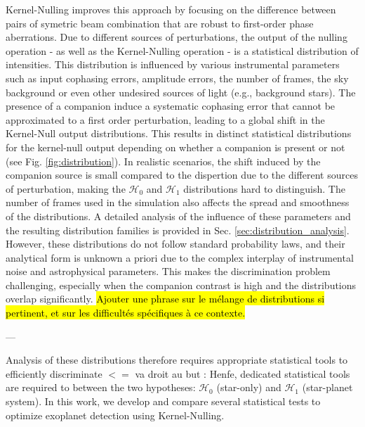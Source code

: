 \documentclass{article}
\newcommand{\dm}[1]{{\color{mulberry} #1}}
\begin{document}
Kernel-Nulling \cite{Martinache2018} improves this approach by focusing on the difference between pairs of symetric beam combination that are robust to first-order phase aberrations. Due to different sources of perturbations, the output of the nulling operation - as well as the Kernel-Nulling operation - is a statistical distribution of intensities. This distribution is influenced by various instrumental parameters such as input cophasing errors, amplitude errors, the number of frames, the sky background or even other undesired sources of light (e.g., background stars). The presence of a companion induce a systematic cophasing error that cannot be approximated to a first order perturbation, leading to a global shift in the Kernel-Null output distributions. This results in distinct statistical distributions for the kernel-null output depending on whether a companion is present or not (see Fig. \ref{fig:distribution}). In realistic scenarios, the shift induced by the companion source is small compared to the dispertion due to the different sources of perturbation, making the $\mathcal{H}_0$ and $\mathcal{H}_1$ distributions hard to distinguish. The number of frames used in the simulation also affects the spread and smoothness of the distributions. A detailed analysis of the influence of these parameters and the resulting distribution families is provided in Sec. \ref{sec:distribution_analysis}. However, these distributions do not follow standard probability laws, and their analytical form is unknown a priori due to the complex interplay of instrumental noise and astrophysical parameters. This makes the discrimination problem challenging, especially when the companion contrast is high and the distributions overlap significantly. \hl{Ajouter une phrase sur le mélange de distributions si pertinent, et sur les difficultés spécifiques à ce contexte.}

---

Analysis of these distributions therefore requires appropriate statistical tools to efficiently discriminate \dm{$<=$ va droit au but : Henfe, dedicated statistical tools are required to} between the two hypotheses: $\mathcal{H}_0$ (star-only) and $\mathcal{H}_1$ (star-planet system). In this work, we develop and compare several statistical tests to optimize exoplanet detection using Kernel-Nulling.
\end{document}

